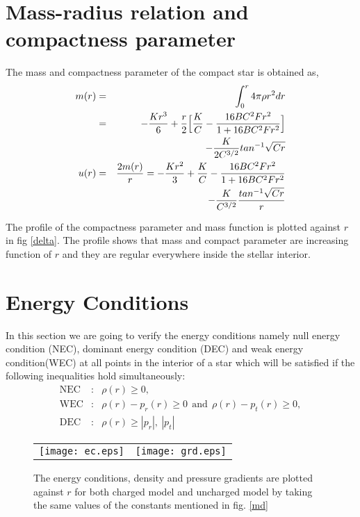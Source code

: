 \documentclass[preprintnumbers,amsmath,amssymb,floatfix,9pt,prd,twocolumn,
superscriptaddress,nofootinbib]{revtex4}
\begin{document}
\section{Mass-radius relation and compactness parameter}
The mass and compactness parameter of the compact star is obtained as,
\begin{eqnarray}
m(r) &=& \int_0^r4\pi\rho r^{2}dr\nonumber\\
&=&-\frac{K r^3}{6} + \frac{r}{2}\Big[\frac{K}{C} -\frac{16 B C^2 F r^2}{1+16 B C^2 F r^2}\Big]\nonumber\\
&& -
 \frac{K}{2C^{3/2}}tan^{-1}\sqrt{Cr}\\
u(r) &=& {2m(r) \over r}=-\frac{K r^2}{3} + \frac{K}{C} -\frac{16 B C^2 F r^2}{1+16 B C^2 F r^2}\nonumber\\
&& -\frac{K}{C^{3/2}}\frac{tan^{-1}\sqrt{Cr}}{r}
\end{eqnarray}

The profile of the compactness parameter and mass function is plotted against $r$ in fig \ref{delta}. The profile shows that mass and compact parameter are increasing function of $r$ and they are regular everywhere inside the stellar interior.



\section{Energy Conditions}

In this section we are going to verify the energy conditions namely null energy condition (NEC), dominant energy condition (DEC) and weak energy condition(WEC) at all points in the interior of a star which will be satisfied if the following inequalities hold simultaneously:
\begin{eqnarray}
\text{NEC} &:& \rho(r)\geq  0 ,\\
\text{WEC} &:& \rho(r)-p_r(r) \geq  0~~ \text{and} ~~\rho(r)-p_t(r) \geq  0,\\
\text{DEC} &:& \rho(r) \ge |p_r|,~|p_t|
\end{eqnarray}


\begin{figure*}[thbp]
\begin{center}
\begin{tabular}{rl}
\texttt{[image: ec.eps]}&
\texttt{[image: grd.eps]}\\
\end{tabular}
\end{center}
\caption{The energy conditions, density and pressure gradients are plotted against $r$ for both charged model  and uncharged model by taking the same values of the constants mentioned in fig. \ref{md}}\label{ec}
\end{figure*}
\end{document}
